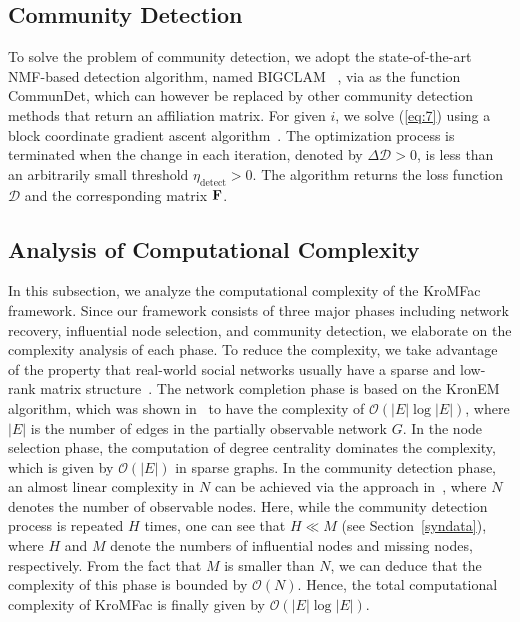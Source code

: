 \documentclass[format=acmsmall, review=false, screen=true]{acmart}
\def \log{\operatorname{log}}
\begin{document}
\subsection{Community Detection}

To solve the problem of community detection, we adopt the state-of-the-art NMF-based detection algorithm, named BIGCLAM ~\cite{bigclam}, via as the function \textsf{CommunDet}, which can however be replaced by other community detection methods that return an affiliation matrix. For given $i$, we solve (\ref{eq:7}) using a block coordinate gradient ascent algorithm~\cite{nmfsolve}. The optimization process is terminated when the change in each iteration, denoted by $\Delta\mathcal{D} > 0$, is less than an arbitrarily small threshold $\eta_{\text{detect}} > 0$. The algorithm returns the loss function $\mathcal{D}$ and the corresponding matrix ${\bf F}$.

\subsection{Analysis of  Computational Complexity}
In this subsection, we analyze the computational complexity of the \textsf{KroMFac} framework. Since our framework consists of three major phases including network recovery, influential node selection, and community detection, we elaborate on the complexity analysis of each phase. To reduce the complexity, we take advantage of the property that real-world social networks usually have a sparse and low-rank matrix structure~\cite{Richard}.
The network completion phase is based on the KronEM algorithm, which was shown in~\cite{kronem} to have the complexity of $\mathcal{O}(|E|\log |E|)$, where $|E|$ is the number of edges in the partially observable network $G$. In the node selection phase, the computation of degree centrality dominates the complexity, which is given by $\mathcal{O}(|E|)$ in sparse graphs. In the community detection phase, an almost linear complexity in $N$ can be achieved via the approach in~\cite{bigclam}, where $N$ denotes the number of observable nodes. Here, while the community detection process is repeated $H$ times, one can see that $H \ll M$ (see Section~\ref{syndata}), where $H$ and $M$ denote the numbers of influential nodes and missing nodes, respectively. From the fact that $M$ is smaller than $N$, we can deduce that the complexity of this phase is bounded by $\mathcal{O}(N)$. Hence, the total computational complexity of \textsf{KroMFac} is finally given by $\mathcal{O}(|E|\log|E|)$.
\end{document}
